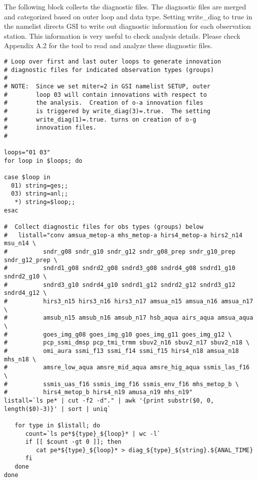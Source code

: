The following block collects the diagnostic files. The diagnostic files are merged and categorized based on outer loop and data type. Setting write\_diag to true in the namelist directs GSI to write out diagnostic information for each observation station. This information is very useful to check analysis details. Please check Appendix A.2 for the tool to read and analyze these diagnostic files.

\begin{footnotesize}
\begin{verbatim}
# Loop over first and last outer loops to generate innovation
# diagnostic files for indicated observation types (groups)
#
# NOTE:  Since we set miter=2 in GSI namelist SETUP, outer
#        loop 03 will contain innovations with respect to
#        the analysis.  Creation of o-a innovation files
#        is triggered by write_diag(3)=.true.  The setting
#        write_diag(1)=.true. turns on creation of o-g
#        innovation files.
#

loops="01 03"
for loop in $loops; do

case $loop in
  01) string=ges;;
  03) string=anl;;
   *) string=$loop;;
esac

#  Collect diagnostic files for obs types (groups) below
#   listall="conv amsua_metop-a mhs_metop-a hirs4_metop-a hirs2_n14 msu_n14 \
#          sndr_g08 sndr_g10 sndr_g12 sndr_g08_prep sndr_g10_prep sndr_g12_prep \
#          sndrd1_g08 sndrd2_g08 sndrd3_g08 sndrd4_g08 sndrd1_g10 sndrd2_g10 \
#          sndrd3_g10 sndrd4_g10 sndrd1_g12 sndrd2_g12 sndrd3_g12 sndrd4_g12 \
#          hirs3_n15 hirs3_n16 hirs3_n17 amsua_n15 amsua_n16 amsua_n17 \
#          amsub_n15 amsub_n16 amsub_n17 hsb_aqua airs_aqua amsua_aqua \
#          goes_img_g08 goes_img_g10 goes_img_g11 goes_img_g12 \
#          pcp_ssmi_dmsp pcp_tmi_trmm sbuv2_n16 sbuv2_n17 sbuv2_n18 \
#          omi_aura ssmi_f13 ssmi_f14 ssmi_f15 hirs4_n18 amsua_n18 mhs_n18 \
#          amsre_low_aqua amsre_mid_aqua amsre_hig_aqua ssmis_las_f16 \
#          ssmis_uas_f16 ssmis_img_f16 ssmis_env_f16 mhs_metop_b \
#          hirs4_metop_b hirs4_n19 amusa_n19 mhs_n19"
listall=`ls pe* | cut -f2 -d"." | awk '{print substr($0, 0, length($0)-3)}' | sort | uniq`

   for type in $listall; do
      count=`ls pe*${type}_${loop}* | wc -l`
      if [[ $count -gt 0 ]]; then
         cat pe*${type}_${loop}* > diag_${type}_${string}.${ANAL_TIME}
      fi
   done
done
\end{verbatim}
\end{footnotesize}

